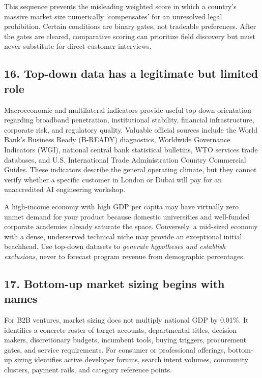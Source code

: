 This sequence prevents the misleading weighted score in which a country's massive market size numerically `compensates' for an unresolved legal prohibition. Certain conditions are binary gates, not tradeable preferences. After the gates are cleared, comparative scoring can prioritize field discovery but must never substitute for direct customer interviews.

\subsection{16. Top-down data has a legitimate but limited role}

Macroeconomic and multilateral indicators provide useful top-down orientation regarding broadband penetration, institutional stability, financial infrastructure, corporate risk, and regulatory quality. Valuable official sources include the World Bank's Business Ready (B-READY) diagnostics, Worldwide Governance Indicators (WGI), national central bank statistical bulletins, WTO services trade databases, and U.S. International Trade Administration Country Commercial Guides. These indicators describe the general operating climate, but they cannot verify whether a specific customer in London or Dubai will pay for an unaccredited AI engineering workshop.

A high-income economy with high GDP per capita may have virtually zero unmet demand for your product because domestic universities and well-funded corporate academies already saturate the space. Conversely, a mid-sized economy with a dense, underserved technical niche may provide an exceptional initial beachhead. Use top-down datasets to \textit{generate hypotheses and establish exclusions}, never to forecast program revenue from demographic percentages.

\subsection{17. Bottom-up market sizing begins with names}

For B2B ventures, market sizing does not multiply national GDP by 0.01\%. It identifies a concrete roster of target accounts, departmental titles, decision-makers, discretionary budgets, incumbent tools, buying triggers, procurement gates, and service requirements. For consumer or professional offerings, bottom-up sizing identifies active developer forums, search intent volumes, community clusters, payment rails, and category reference points.

